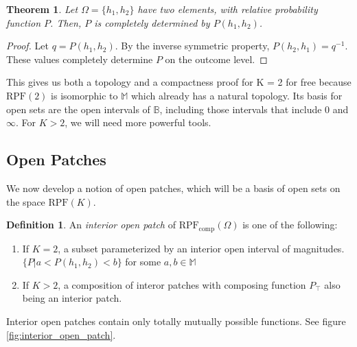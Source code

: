 \documentclass[twoside]{article}
\theoremstyle{plain}%
\newtheorem{theorem}{Theorem}[section]
\theoremstyle{definition}
\newtheorem{definition}{Definition}[section]
\theoremstyle{remark}
\begin{document}
\begin{theorem}
Let \(\Omega = \{h_1, h_2\}\) have two elements, with relative probability function \(P\). Then, \(P\) is completely determined by \(P(h_1, h_2)\).
\end{theorem}

\begin{proof}
Let \(q = P(h_1, h_2)\). By the inverse symmetric property, \(P(h_2, h_1) = q^{-1}\). These values completely determine \(P\) on the outcome level.
\end{proof}

This gives us both a topology and a compactness proof for K = 2 for free because \(\text{RPF}(2)\) is isomorphic to \(\mathbb{M}\) which already has a natural topology. Its basis for open sets are the open intervals of \(\mathbb{B}\), including those intervals that include 0 and \(\infty\). For \(K > 2\), we will need more powerful tools.

\subsection{Open Patches}

We now develop a notion of open patches, which will be a basis of open sets on the space \(\text{RPF}(K)\).

\begin{definition}
An \textit{interior open patch} of \(\text{RPF}_{\text{comp}}(\Omega)\) is one of the following:

\begin{enumerate}
  \item If \(K = 2\), a subset parameterized by an interior open interval of magnitudes. \(\{P | a < P(h_1, h_2) < b\}\) for some \(a, b \in \mathbb{M}\) 
  \item If \(K > 2\), a composition of interor patches with composing function \(P_{\top}\) also being an interior patch.
\end{enumerate}
\end{definition}

Interior open patches contain only totally mutually possible functions. See figure \ref{fig:interior_open_patch}.
\end{document}
